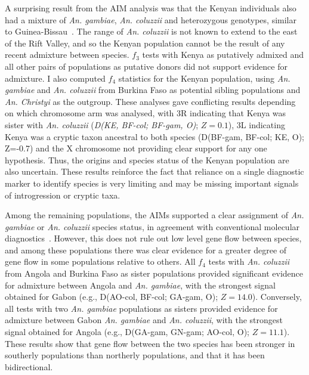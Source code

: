 \documentclass[a4paper,11pt,abstracton,hidelinks]{scrartcl}
\begin{document}
A surprising result from the AIM analysis was that the Kenyan individuals also had a mixture of \textit{An. gambiae}, \textit{An. coluzzii} and heterozygous genotypes, similar to Guinea-Bissau~\parencite{Ag1000G2017}.
%
The range of \textit{An. coluzzii} is not known to extend to the east of the Rift Valley, and so the Kenyan population cannot be the result of any recent admixture between species.
%
$f_3$ tests with Kenya as putatively admixed and all other pairs of populations as putative donors did not support evidence for admixture.
%
I also computed $f_4$ statistics for the Kenyan population, using \textit{An. gambiae} and \textit{An. coluzzii} from Burkina Faso as potential sibling populations and \textit{An. Christyi} as the outgroup.
%
These analyses gave conflicting results depending on which chromosome arm was analysed, with 3R indicating that Kenya was sister with \textit{An. coluzzii} (\textit{D(KE, BF-col; BF-gam, O)}; $Z=0.1$), 3L indicating Kenya was a cryptic taxon ancestral to both species (D(BF-gam, BF-col; KE, O); Z=-0.7) and the X chromosome not providing clear support for any one hypothesis.
%
Thus, the origins and species status of the Kenyan population are also uncertain.
%
These results reinforce the fact that reliance on a single diagnostic marker to identify species is very limiting and may be missing important signals of introgression or cryptic taxa.


Among the remaining populations, the AIMs supported a clear assignment of \textit{An. gambiae} or \textit{An. coluzzii} species status, in agreement with conventional molecular diagnostics~\parencite{Ag1000G2017}.
%
However, this does not rule out low level gene flow between species, and among these populations there was clear evidence for a greater degree of gene flow in some populations relative to others.
%
All $f_4$ tests with \textit{An. coluzzii} from Angola and Burkina Faso as sister populations provided significant evidence for admixture between Angola and \textit{An. gambiae}, with the strongest signal obtained for Gabon (e.g., D(AO-col, BF-col; GA-gam, O); $Z=14.0$).
%
Conversely, all tests with two \textit{An. gambiae} populations as sisters provided evidence for admixture between Gabon \textit{An. gambiae} and \textit{An. coluzzii}, with the strongest signal obtained for Angola (e.g., D(GA-gam, GN-gam; AO-col, O); $Z=11.1$).
%
These results show that gene flow between the two species has been stronger in southerly populations than northerly populations, and that it has been bidirectional.
\end{document}
